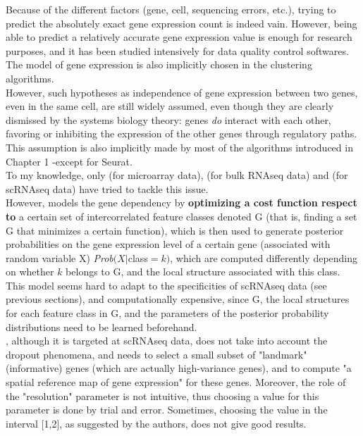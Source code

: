 \documentclass{report}
\begin{document}
{Because of the different factors (gene, cell, sequencing errors, etc.), trying to predict the absolutely exact gene expression count is indeed vain. However, being able to predict a relatively accurate gene expression value is enough for research purposes, and it has been studied intensively for data quality control softwares\cite{kharchenko2014bayesian}\cite{finak2015mast}\cite{love2014moderated}\cite{chen2014differential}. The model of gene expression is also implicitly chosen in the clustering algorithms.\\

However, such hypotheses as independence of gene expression between two genes, even in the same cell, are still widely assumed\cite{barash2002context}, even though they are clearly dismissed by the systems biology theory: genes \textit{do} interact with each other, favoring or inhibiting the expression of the other genes through regulatory paths. This assumption is also implicitly made by most of the algorithms introduced in Chapter 1 -except for Seurat\cite{satija2015spatial}.\\

To my knowledge, only \cite{barash2002context} (for microarray data), \cite{zhang2017classification} (for bulk RNAseq data) and \cite{satija2015spatial} (for scRNAseq data) have tried to tackle this issue.\\

However, \cite{barash2002context} models the gene dependency by \textbf{optimizing a cost function respect to} a certain set of intercorrelated feature classes denoted G (that is, finding a set G that minimizes a certain function), which is then used to generate posterior probabilities on the gene expression level of a certain gene (associated with random variable X) \textit{Prob}$(X | $class$ = k)$, which are computed differently depending on whether $k$ belongs to G, and the local structure associated with this class. This model seems hard to adapt to the specificities of scRNAseq data (see previous sections), and computationally expensive, since G, the local structures for each feature class in G, and the parameters of the posterior probability distributions need to be learned beforehand.\\

\cite{satija2015spatial}, although it is targeted at scRNAseq data, does not take into account the dropout phenomena, and needs to select a small subset of "landmark" (informative) genes (which are actually high-variance genes), and to compute "a spatial reference map of gene expression" for these genes. Moreover, the role of the "resolution" parameter is not intuitive, thus choosing a value for this parameter is done by trial and error. Sometimes, choosing the value in the interval [1,2], as suggested by the authors, does not give good results.\\

}
\end{document}
